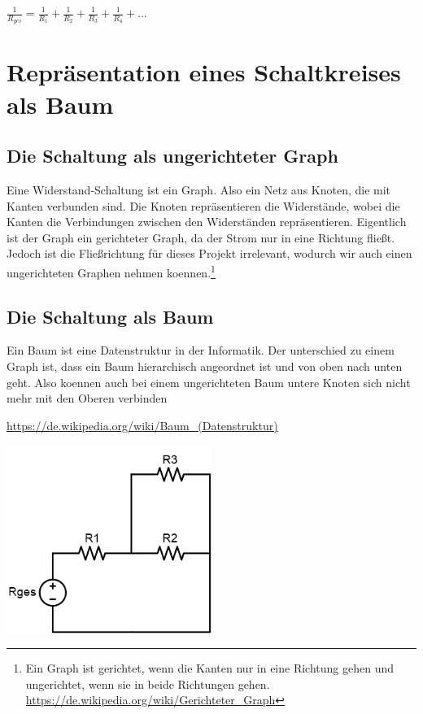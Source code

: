 \documentclass[a4paper,10pt,ngerman]{scrartcl}
\begin{document}
$\frac{1}{R_{ges}} = \frac{1}{R_{1}} + \frac{1}{R_{2}} + \frac{1}{R_{3}} + \frac{1}{R_{4}} +...$

\section{Repräsentation eines Schaltkreises als Baum}

\subsection{Die Schaltung als ungerichteter Graph}

Eine Widerstand-Schaltung ist ein Graph. Also ein Netz aus Knoten, die mit Kanten verbunden sind. Die Knoten repräsentieren die Widerstände, wobei die Kanten die Verbindungen zwischen den Widerständen repräsentieren.
Eigentlich ist der Graph ein gerichteter Graph, da der Strom nur in eine Richtung fließt. Jedoch ist die Fließrichtung für dieses Projekt irrelevant, wodurch wir auch einen ungerichteten Graphen nehmen koennen.\footnote{Ein Graph ist gerichtet, wenn die Kanten nur in eine Richtung gehen und ungerichtet, wenn sie in beide Richtungen gehen. \url{https://de.wikipedia.org/wiki/Gerichteter_Graph}}

\subsection{Die Schaltung als Baum}
\label{subsec:baum}

Ein Baum ist eine Datenstruktur in der Informatik. Der unterschied zu einem Graph ist, dass ein Baum hierarchisch angeordnet ist und von oben nach unten geht. Also koennen auch bei einem ungerichteten Baum untere Knoten sich nicht mehr mit den Oberen verbinden

\url{https://de.wikipedia.org/wiki/Baum_(Datenstruktur)}

\includegraphics[width=0.5\textwidth]{circuit3.png}
\end{document}
